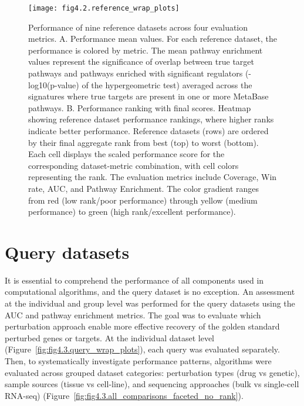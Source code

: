 \begin{figure}[htbp]
    \centering
    \texttt{[image: fig4.2.reference\_wrap\_plots]}
    \caption[Performance of nine reference datasets across four evaluation metrics.]{Performance of nine reference datasets across four evaluation metrics. A. Performance mean values. For each reference dataset, the performance is colored by metric. The mean pathway enrichment values represent the significance of overlap between true target pathways and pathways enriched with significant regulators (-log10(p-value) of the hypergeometric test) averaged across the signatures where true targets are present in one or more MetaBase pathways. B. Performance ranking with final scores. Heatmap showing reference dataset performance rankings, where higher ranks indicate better performance. Reference datasets (rows) are ordered by their final aggregate rank from best (top) to worst (bottom). Each cell displays the scaled performance score for the corresponding dataset-metric combination, with cell colors representing the rank. The evaluation metrics include Coverage, Win rate, \gls{AUC}, and Pathway Enrichment. The color gradient ranges from red (low rank/poor performance) through yellow (medium performance) to green (high rank/excellent performance).}
    \label{fig:fig4.2.reference_wrap_plots}
\end{figure}



\section{Query datasets} %
\label{sec:query_datasets_results}

It is essential to comprehend the performance of all components used in computational algorithms, and the query dataset is no exception. An assessment at the individual and group level was performed for the query datasets using the \gls{AUC} and pathway enrichment metrics. The goal was to evaluate which perturbation approach enable more effective recovery of the golden standard perturbed genes or targets. At the individual dataset level (Figure~\ref{fig:fig4.3.query_wrap_plots}), each query was evaluated separately. Then, to systematically investigate performance patterns, algorithms were evaluated across grouped dataset categories: perturbation types (drug vs genetic), sample sources (tissue vs cell-line), and sequencing approaches (bulk vs single-cell RNA-seq) (Figure~\ref{fig:fig4.3.all_comparisons_faceted_no_rank}).

